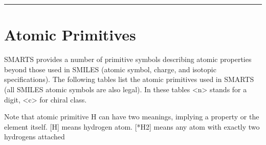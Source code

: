 \begin{itemize}
\rule{6in}{0.01cm}\par
{}\par
\section{Atomic Primitives}
   SMARTS provides a number of primitive symbols describing atomic properties beyond those used in SMILES (atomic symbol, charge, and isotopic specifications). The following tables list the atomic primitives used in SMARTS (all SMILES atomic symbols are also legal). In these tables <n> stands for a digit, <c> for chiral class.

   Note that atomic primitive H can have two meanings, implying a property or the element itself. [H] means hydrogen atom. [*H2] means any atom with exactly two hydrogens attached
   

\end{itemize}
